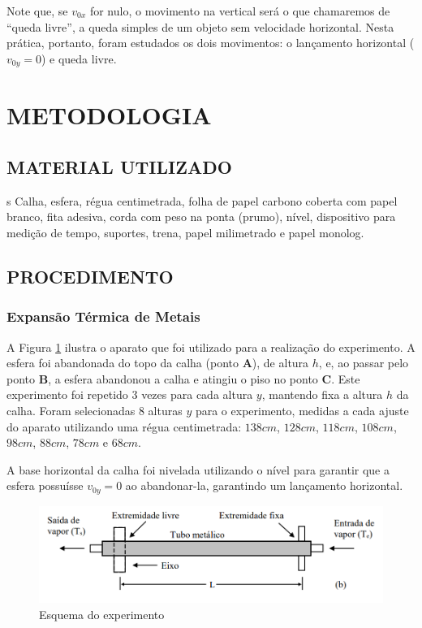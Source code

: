 \documentclass[10pt]{article}
\begin{document}
Note que, se $v_{0x}$ for nulo, o movimento na vertical será o que chamaremos de ``queda livre'', a queda simples de um objeto sem velocidade horizontal. Nesta prática, portanto, foram estudados os dois movimentos: o lançamento horizontal ($v_{0y} = 0$) e queda livre.

\section{METODOLOGIA}

\subsection{MATERIAL UTILIZADO}
s
Calha, esfera, régua centimetrada, folha de papel carbono coberta com papel branco, fita adesiva, corda com peso na ponta (prumo), nível, dispositivo para medição de tempo, suportes, trena, papel milimetrado e papel monolog.

\subsection{PROCEDIMENTO}

\subsubsection{Expansão Térmica de Metais}
A Figura \ref{fig:aparatos1} ilustra o aparato que foi utilizado para a realização do experimento. A esfera foi abandonada do topo da calha (ponto \textbf{A}), de altura $h$, e, ao passar pelo ponto \textbf{B}, a esfera abandonou a calha e atingiu o piso no ponto \textbf{C}. Este experimento foi repetido 3 vezes para cada altura $y$, mantendo fixa a altura $h$ da calha. Foram selecionadas 8 alturas $y$ para o experimento, medidas a cada ajuste do aparato utilizando uma régua centimetrada: $138cm$, $128cm$, $118cm$, $108cm$, $98cm$, $88cm$, $78cm$ e $68cm$.

A base horizontal da calha foi nivelada utilizando o nível para garantir que a esfera possuísse $v_{0y} = 0$ ao abandonar-la, garantindo um lançamento horizontal.

\begin{figure}
	\begin{center}
		\includegraphics[scale=0.5]{aparatos_experimento_1.png}
		\caption{Esquema do experimento}
		\label{fig:aparatos1}
	\end{center}
\end{figure}
\end{document}
